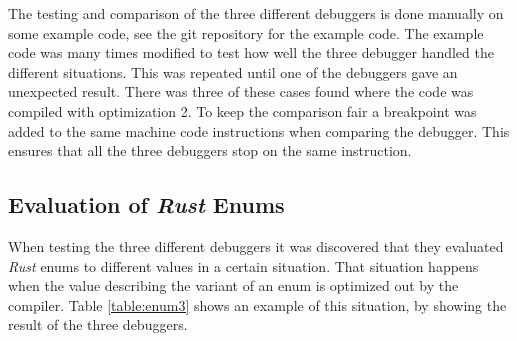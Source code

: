 The testing and comparison of the three different debuggers is done manually on some example code, see the git repository \cite{example-code} for the example code.
The example code was many times modified to test how well the three debugger handled the different situations.
This was repeated until one of the debuggers gave an unexpected result.
There was three of these cases found where the code was compiled with optimization 2.
To keep the comparison fair a breakpoint was added to the same machine code instructions when comparing the debugger.
This ensures that all the three debuggers stop on the same instruction.



\subsection{Evaluation of \emph{Rust} Enums}
When testing the three different debuggers it was discovered that they evaluated \emph{Rust} enums to different values in a certain situation.
That situation happens when the value describing the variant of an enum is optimized out by the compiler.
Table \ref{table:enum3} shows an example of this situation, by showing the result of the three debuggers.

